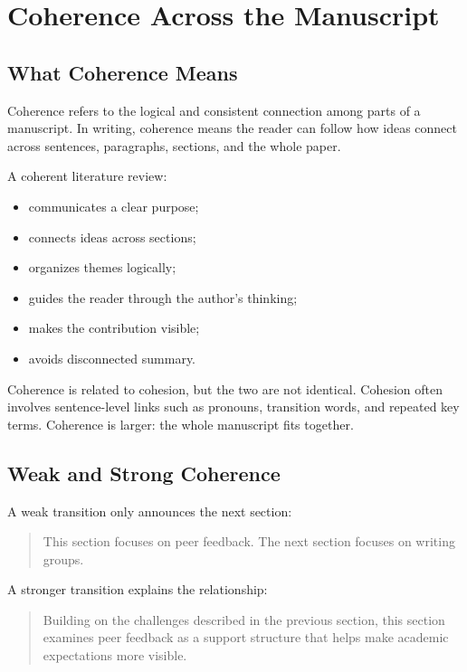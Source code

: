 \documentclass[11pt]{article}
\begin{document}
\section{Coherence Across the Manuscript}

\subsection{What Coherence Means}

Coherence refers to the logical and consistent connection among parts of a manuscript. In writing, coherence means the reader can follow how ideas connect across sentences, paragraphs, sections, and the whole paper.

A coherent literature review:

\begin{itemize}
  \item communicates a clear purpose;
  \item connects ideas across sections;
  \item organizes themes logically;
  \item guides the reader through the author's thinking;
  \item makes the contribution visible;
  \item avoids disconnected summary.
\end{itemize}

Coherence is related to cohesion, but the two are not identical. Cohesion often involves sentence-level links such as pronouns, transition words, and repeated key terms. Coherence is larger: the whole manuscript fits together.

\subsection{Weak and Strong Coherence}

A weak transition only announces the next section:

\begin{quote}
This section focuses on peer feedback. The next section focuses on writing groups.
\end{quote}

A stronger transition explains the relationship:

\begin{quote}
Building on the challenges described in the previous section, this section examines peer feedback as a support structure that helps make academic expectations more visible.
\end{quote}
\end{document}

